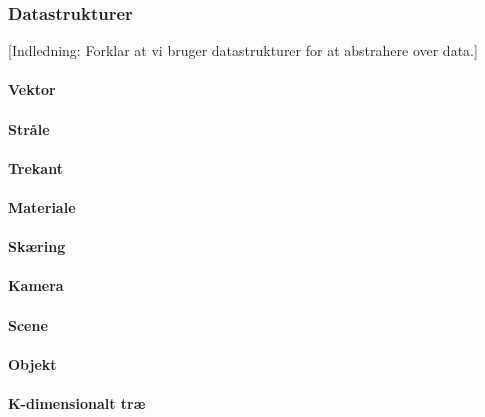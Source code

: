 \subsubsection{Datastrukturer}
[Indledning: Forklar at vi bruger datastrukturer for at abstrahere over data.]
\paragraph{Vektor}
\paragraph{Stråle}
\paragraph{Trekant}
\paragraph{Materiale}

\paragraph{Skæring}
\paragraph{Kamera}
\paragraph{Scene}
\paragraph{Objekt}
\paragraph{K-dimensionalt træ}